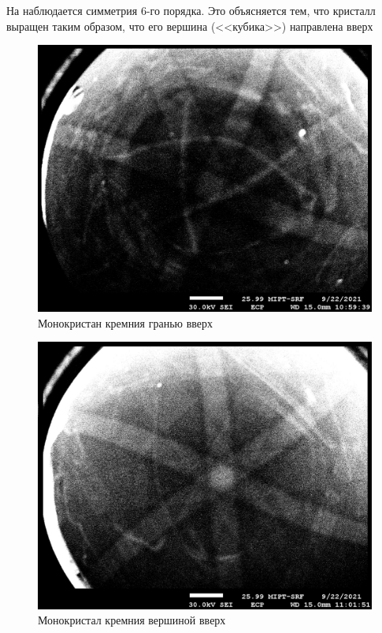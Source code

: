 \documentclass[a4paper,12pt]{article}
\theoremstyle{plain} %
\theoremstyle{definition} %
\theoremstyle{remark} %
\newcommand{\picref}[1]{
	\text{рис(\ref{#1})}
}
\begin{document}
На \picref{pic13} наблюдается симметрия 6-го порядка. Это объясняется тем, что кристалл выращен таким образом, что его вершина (<<кубика>>) направлена вверх 

\begin{figure}[h!]
	\centering
	\includegraphics[scale=1]{pic12.jpg}
	\caption{Монокристан кремния гранью вверх}
	\label{pic12}
\end{figure}
\begin{figure}[h!]
	\centering
	\includegraphics[scale=1]{pic13.jpg}
	\caption{Монокристал кремния вершиной вверх}
	\label{pic13}
\end{figure}
\end{document}
